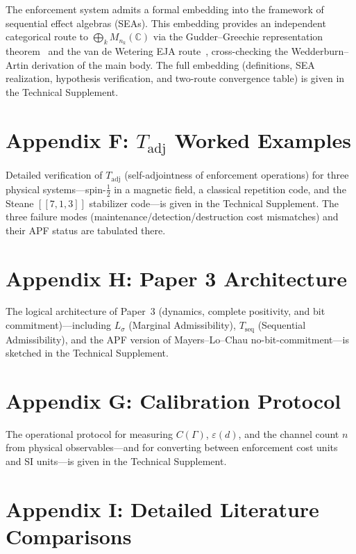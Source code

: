 \documentclass[11pt]{article}
\theoremstyle{remark}
\begin{document}
The enforcement system admits a formal embedding into the framework of sequential effect algebras (SEAs).  This embedding provides an independent categorical route to $\bigoplus_k M_{n_k}(\mathbb{C})$ via the Gudder--Greechie representation theorem~\cite{GudderGreechie2002} and the van de Wetering EJA route~\cite{vandeWetering2019}, cross-checking the Wedderburn--Artin derivation of the main body.  The full embedding (definitions, SEA realization, hypothesis verification, and two-route convergence table) is given in the Technical Supplement.
\label{def:sea}\label{prop:sea}\label{thm:gg}\label{prop:gg_hyps}\label{cor:hilbert_sea}


\section*{Appendix F: $T_{\mathrm{adj}}$ Worked Examples}

Detailed verification of $T_{\mathrm{adj}}$ (self-adjointness of enforcement operations) for three physical systems---spin-$\frac{1}{2}$ in a magnetic field, a classical repetition code, and the Steane $[\![7,1,3]\!]$ stabilizer code---is given in the Technical Supplement.  The three failure modes (maintenance/detection/destruction cost mismatches) and their APF status are tabulated there.

\section*{Appendix H: Paper 3 Architecture}

The logical architecture of Paper~3 (dynamics, complete positivity, and bit commitment)---including $L_\sigma$ (Marginal Admissibility), $T_{\mathrm{seq}}$ (Sequential Admissibility), and the APF version of Mayers--Lo--Chau no-bit-commitment---is sketched in the Technical Supplement.

\section*{Appendix G: Calibration Protocol}

The operational protocol for measuring $C(\Gamma)$, $\varepsilon(d)$, and the channel count $n$ from physical observables---and for converting between enforcement cost units and SI units---is given in the Technical Supplement.

\section*{Appendix I: Detailed Literature Comparisons}
\label{app:literature}
\end{document}
